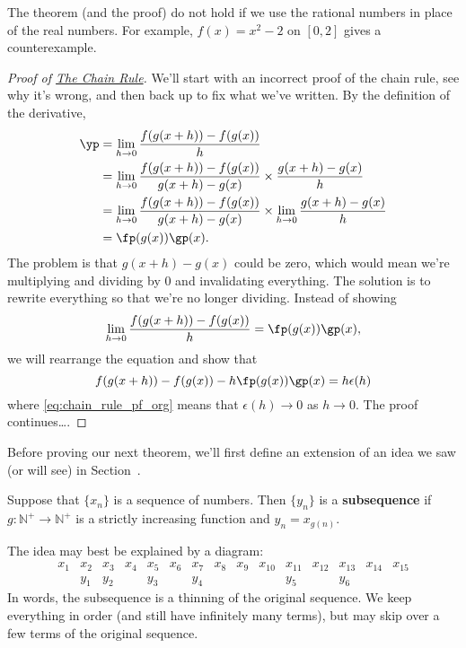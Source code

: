 The theorem (and the proof) do not hold if we use the rational numbers in place of the real numbers.  For example, $f(x)=x^2-2$ on $[0,2]$ gives a counterexample.


\begin{proof}[Proof of {\hyperref[thm:chain_rule]{The Chain Rule}}]
\label{pf:chain_rule}
We'll start with an incorrect proof of the chain rule, see why it's wrong, and then back up to fix what we've written.  By the definition of the derivative,
\begin{align*}
 \yp
 &= \lim_{h\to 0}\frac{f(g(x+h))-f(g(x))}h \\
 &= \lim_{h\to 0}\frac{f(g(x+h))-f(g(x))}{g(x+h)-g(x)}\times\frac{g(x+h)-g(x)}h \\
 &= \lim_{h\to 0}\frac{f(g(x+h))-f(g(x))}{g(x+h)-g(x)}\times
 \lim_{h\to 0}\frac{g(x+h)-g(x)}h \\
 &= \fp(g(x))\gp(x).
\end{align*}
The problem is that $g(x+h)-g(x)$ could be zero, which would mean we're multiplying and dividing by 0 and invalidating everything.  The solution is to rewrite everything so that we're no longer dividing.  Instead of showing
\begin{equation}\label{eq:chain_rule_pf_org}
 \lim_{h\to 0}\frac{f(g(x+h))-f(g(x))}h=\fp(g(x))\gp(x),
\end{equation}
we will rearrange the equation and show that
\[f(g(x+h))-f(g(x))-h\fp(g(x))\gp(x)=h\epsilon(h)\]
where \eqref{eq:chain_rule_pf_org} means that $\epsilon(h)\to0$ as $h\to0$.  The proof continues\ldots.
\end{proof}

Before proving our next theorem, we'll first define an extension of an idea we saw (or will see) in Section~.

%
{Suppose that $\{x_n\}$ is a sequence of numbers.  Then $\{y_n\}$ is a \textbf{subsequence} if $g:\mathbb{N}^+\to\mathbb{N}^+$ is a strictly increasing function and $y_n=x_{g(n)}$.}

The idea may best be explained by a diagram:
\[
\begin{array}{ccccccccccccccc}
 x_1 & x_2 & x_3 & x_4 & x_5 & x_6 & x_7 & x_8 & x_9 & x_{10} & x_{11} & x_{12} & x_{13} & x_{14} & x_{15} \\
 & y_1 & y_2 & & y_3 & & y_4 & & & & y_5 & & y_6 & &
\end{array}
\]
In words, the subsequence is a thinning of the original sequence.  We keep everything in order (and still have infinitely many terms), but may skip over a few terms of the original sequence.

